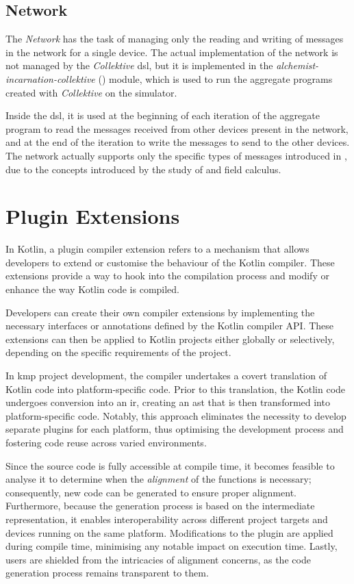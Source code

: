 \subsection{Network}
\label{subsec:network}
The \emph{Network} has the task of managing only the reading and writing of messages in the network for a single device.
The actual implementation of the network is not managed by the \emph{Collektive} \ac{dsl}, but it is implemented in the
\emph{alchemist-incarnation-collektive} () module, which is used to run the aggregate programs
created with \emph{Collektive} on the simulator.

Inside the \ac{dsl}, it is used at the beginning of each iteration of the aggregate program to read the messages received from
other devices present in the network, and at the end of the iteration to write the messages to send to the other devices.
The network actually supports only the specific types of messages introduced in , due to the
concepts introduced by the study of \xc{} and field calculus.

\section{Plugin Extensions}
\label{sec:plugin-extensions}
In Kotlin, a plugin compiler extension refers to a mechanism that allows developers to extend or customise the behaviour
of the Kotlin compiler.
These extensions provide a way to hook into the compilation process and modify or enhance the way Kotlin code is compiled.

Developers can create their own compiler extensions by implementing the necessary interfaces or annotations defined by
the Kotlin compiler API.
These extensions can then be applied to Kotlin projects either globally or selectively, depending on the specific
requirements of the project.

In \ac{kmp} project development, the compiler undertakes a covert translation of Kotlin code into platform-specific code.
Prior to this translation, the Kotlin code undergoes conversion into an \ac{ir}, creating an \ac{ast} that is then
transformed into platform-specific code.
Notably, this approach eliminates the necessity to develop separate plugins for each platform, thus optimising the
development process and fostering code reuse across varied environments.

Since the source code is fully accessible at compile time, it becomes feasible to analyse it to determine when the \emph{alignment}
of the functions is necessary; consequently, new code can be generated to ensure proper alignment.
Furthermore, because the generation process is based on the intermediate representation, it enables interoperability across
different project targets and devices running on the same platform.
Modifications to the plugin are applied during compile time, minimising any notable impact on execution time.
Lastly, users are shielded from the intricacies of alignment concerns, as the code generation process remains transparent to them.

